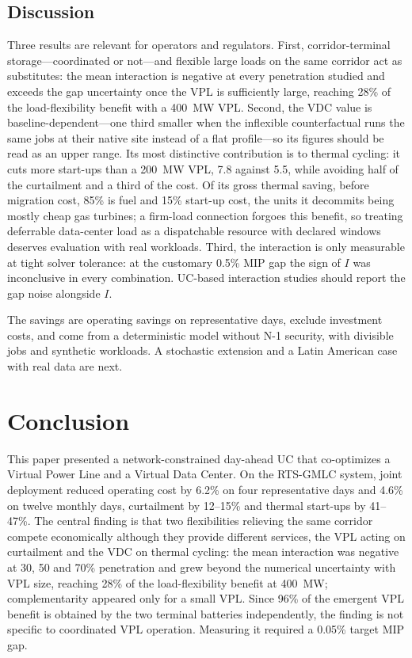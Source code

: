 \documentclass[conference]{IEEEtran}
\begin{document}
\subsection{Discussion}
Three results are relevant for operators and regulators. First, corridor-terminal storage---coordinated or not---and flexible large loads on the same corridor act as substitutes: the mean interaction is negative at every penetration studied and exceeds the gap uncertainty once the VPL is sufficiently large, reaching 28\% of the load-flexibility benefit with a 400~MW VPL. Second, the VDC value is baseline-dependent---one third smaller when the inflexible counterfactual runs the same jobs at their native site instead of a flat profile---so its figures should be read as an upper range. Its most distinctive contribution is to thermal cycling: it cuts more start-ups than a 200~MW VPL, 7.8 against 5.5, while avoiding half of the curtailment and a third of the cost. Of its gross thermal saving, before migration cost, 85\% is fuel and 15\% start-up cost, the units it decommits being mostly cheap gas turbines; a firm-load connection forgoes this benefit, so treating deferrable data-center load as a dispatchable resource with declared windows deserves evaluation with real workloads. Third, the interaction is only measurable at tight solver tolerance: at the customary 0.5\% MIP gap the sign of $I$ was inconclusive in every combination. UC-based interaction studies should report the gap noise alongside $I$.

The savings are operating savings on representative days, exclude investment costs, and come from a deterministic model without N-1 security, with divisible jobs and synthetic workloads. A stochastic extension \cite{wang2025stoch} and a Latin American case with real data are next.

\section{Conclusion}
\label{sec:concl}
This paper presented a network-constrained day-ahead UC that co-optimizes a Virtual Power Line and a Virtual Data Center. On the RTS-GMLC system, joint deployment reduced operating cost by 6.2\% on four representative days and 4.6\% on twelve monthly days, curtailment by 12--15\% and thermal start-ups by 41--47\%. The central finding is that two flexibilities relieving the same corridor compete economically although they provide different services, the VPL acting on curtailment and the VDC on thermal cycling: the mean interaction was negative at 30, 50 and 70\% penetration and grew beyond the numerical uncertainty with VPL size, reaching 28\% of the load-flexibility benefit at 400~MW; complementarity appeared only for a small VPL. Since 96\% of the emergent VPL benefit is obtained by the two terminal batteries independently, the finding is not specific to coordinated VPL operation. Measuring it required a 0.05\% target MIP gap.
\end{document}
